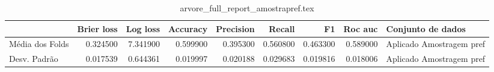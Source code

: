 \begin{table}
\centering
\caption{arvore_full_report_amostrapref.tex}
\label{arvore_full_report_amostrapref.tex}
\begin{tabular}{lrrrrrrrl}
\toprule
{} &  Brier  loss &  Log loss &  Accuracy  &  Precision  &   Recall  &       F1  &  Roc auc  &         Conjunto de dados \\
\midrule
Média dos Folds &     0.324500 &  7.341900 &   0.599900 &    0.395300 &  0.560800 &  0.463300 &  0.589000 &  Aplicado Amostragem pref \\
Desv. Padrão    &     0.017539 &  0.644361 &   0.019997 &    0.020188 &  0.029683 &  0.019816 &  0.018006 &  Aplicado Amostragem pref \\
\bottomrule
\end{tabular}
\end{table}
